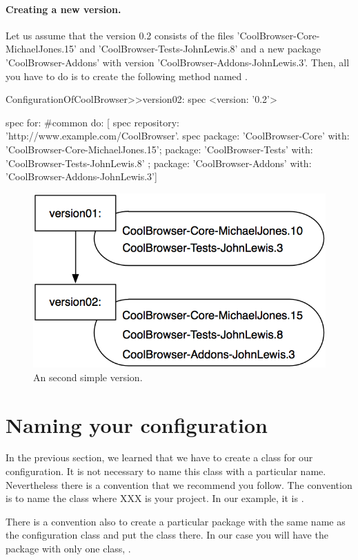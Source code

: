 \documentclass[a4paper,10pt,twoside]{book}
\begin{document}
\paragraph{Creating a new version.}
Let us assume that the version 0.2 consists of the files 'CoolBrowser-Core-MichaelJones.15' and 'CoolBrowser-Tests-JohnLewis.8' and a new package 'CoolBrowser-Addons' with version 'CoolBrowser-Addons-JohnLewis.3'. Then, all you have to do is to create the following method named .

\begin{code}{}
ConfigurationOfCoolBrowser>>version02: spec 
	<version: '0.2'>
	
	spec for: #common do: [
		spec repository: 'http://www.example.com/CoolBrowser'.
		spec 
			package: 'CoolBrowser-Core' with: 'CoolBrowser-Core-MichaelJones.15';
			package: 'CoolBrowser-Tests' with: 'CoolBrowser-Tests-JohnLewis.8' ;
			package: 'CoolBrowser-Addons' with: 'CoolBrowser-Addons-JohnLewis.3']
\end{code}
 
\begin{figure}
\begin{center}
\includegraphics[width=0.6\linewidth]{version02}
\caption{An second simple version.}
\end{center}
\end{figure} 
 

\section{Naming your configuration}

In the previous section, we learned that we have to create a class for our configuration. It is not necessary to name this class with a particular name. Nevertheless there is a convention that we recommend you follow. The convention is to name the class  where XXX is your project. In our example, it is .

There is a convention also to create a particular package with the same name as the configuration class and put the class there. In our case you will have the package  with only one class, . 
\end{document}

